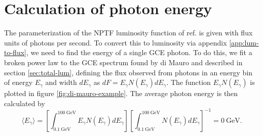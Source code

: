 \documentclass[a4paper,11pt]{article}
\newcommand{\brackets}[1]{\left[#1\right]}
\newcommand{\comment}[1]{\emph{\color{red}{#1}}}
\begin{document}
\section{Calculation of photon energy}
\label{app:photon-energy}
The parameterization of the NPTF luminosity function of ref. \cite{Lee:2015fea} is given with flux units of photons per second. To convert this to luminosity via appendix \ref{app:lum-to-flux}, we need to find the energy of a single GCE photon. To do this, we fit a broken power law to the GCE spectrum found by di Mauro and described in section \ref{sec:total-lum}, defining the flux observed from photons in an energy bin of energy $E_\gamma$ and width $dE_\gamma$ as $dF = E_\gamma N(E_\gamma)dE_\gamma$. The function $E_\gamma N(E_\gamma)$ is plotted in figure \ref{fig:di-mauro-example}. The average photon energy is then calculated by
\begin{equation}
    \langle E_\gamma \rangle =  \brackets{\int_{\SI{0.1}{\giga\electronvolt}}^{\SI{100}{\giga\electronvolt}} E_\gamma N(E_\gamma) dE_\gamma} \brackets{\int_{\SI{0.1}{\giga\electronvolt}}^{\SI{100}{\giga\electronvolt}} N(E_\gamma) dE_\gamma}^{-1} = \SI{0}{\giga\electronvolt}.
    \label{eqn:photon-energy}
\end{equation}
\comment{I'd like to finish this. Give examples of photon energy.}



\acknowledgments
\comment{We should probably acknowledge the Fermilab team for giving us their data. Anyone else?}










\end{document}
